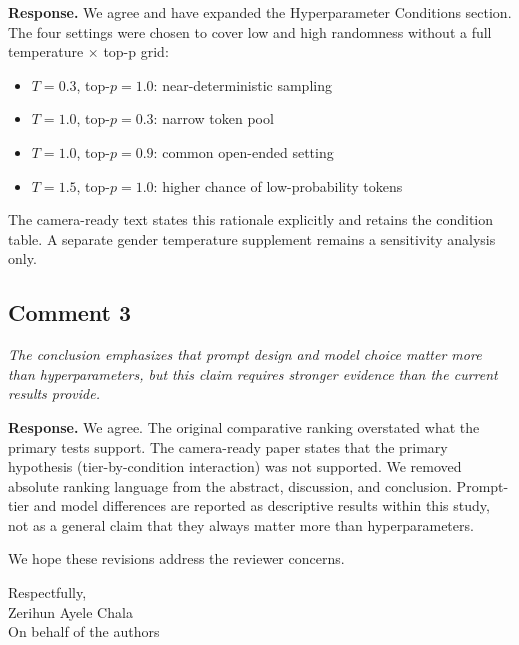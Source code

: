 \documentclass[11pt,a4paper]{article}
\begin{document}
\noindent\textbf{Response.} We agree and have expanded the Hyperparameter Conditions section. The four settings were chosen to cover low and high randomness without a full temperature $\times$ top-p grid:
\begin{itemize}
  \item $T=0.3$, top-$p=1.0$: near-deterministic sampling
  \item $T=1.0$, top-$p=0.3$: narrow token pool
  \item $T=1.0$, top-$p=0.9$: common open-ended setting
  \item $T=1.5$, top-$p=1.0$: higher chance of low-probability tokens
\end{itemize}
The camera-ready text states this rationale explicitly and retains the condition table. A separate gender temperature supplement remains a sensitivity analysis only.

\subsection*{Comment 3}
\textit{The conclusion emphasizes that prompt design and model choice matter more than hyperparameters, but this claim requires stronger evidence than the current results provide.}

\noindent\textbf{Response.} We agree. The original comparative ranking overstated what the primary tests support. The camera-ready paper states that the primary hypothesis (tier-by-condition interaction) was not supported. We removed absolute ranking language from the abstract, discussion, and conclusion. Prompt-tier and model differences are reported as descriptive results within this study, not as a general claim that they always matter more than hyperparameters.

\vspace{6pt}
\noindent We hope these revisions address the reviewer concerns.

\vspace{10pt}
\noindent Respectfully,\\[6pt]
Zerihun Ayele Chala\\
On behalf of the authors
\end{document}
